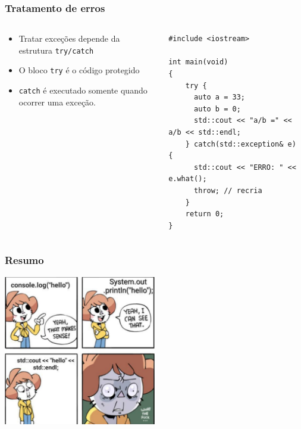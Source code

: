 \documentclass[xcolor={usenames,dvipsnames},10pt,presentation,aspectratio=169]{beamer}
\begin{document}
\begin{frame}[fragile]
  \frametitle{Tratamento de erros}
  \vspace{-2mm}
    \begin{columns}
      \begin{column}{0.4\textwidth}
          \begin{itemize}
            \item Tratar exceções depende da estrutura \texttt{try/catch}
            \item O bloco \texttt{try} é o código protegido
            \item \texttt{catch} é executado somente quando ocorrer uma exceção.
          \end{itemize}
     \end{column}
      \begin{column}{0.6\textwidth}
  \begin{block}{}
\begin{lstlisting}
#include <iostream>

int main(void)
{
    try {
      auto a = 33;
      auto b = 0;
      std::cout << "a/b =" << a/b << std::endl;
    } catch(std::exception& e) {
      std::cout << "ERRO: " << e.what(); 
      throw; // recria
    }
    return 0;
}
\end{lstlisting}
\end{block}
      \end{column}
    \end{columns}
%
\end{frame}
\begin{frame}
  \frametitle{Resumo}
  \begin{center}
	\includegraphics[width=0.5\textwidth]{cout.jpeg}
  \end{center}
\end{frame}
\end{document}
